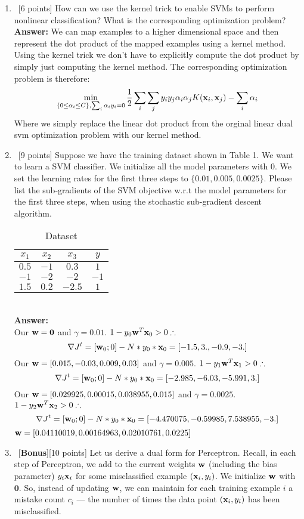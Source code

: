\documentclass[12pt, fullpage,letterpaper]{article}
\newcommand{\Answer}{{\\\textbf{Answer: }}}
\begin{document}
\begin{enumerate}
	
	\item~[6 points] How can we use the kernel trick to enable SVMs to perform nonlinear classification? What is the corresponding optimization problem?
	\Answer We can map examples to a higher dimensional space and then represent the dot product of the mapped examples using a kernel method.  Using the kernel trick we don't have to explicitly compute the dot product by simply just computing the kernel method.  The corresponding optimization problem is therefore: 
	\[\min_{\{0 \leq \alpha_i \leq C\}, \sum_i \alpha_i y_i = 0} \frac{1}{2}\sum_i \sum_j y_i y_j \alpha_i \alpha_j K({\bf x}_i, {\bf x}_j) - \sum_i \alpha_i\]
	Where we simply replace the linear dot product from the orginal linear dual svm optimization problem with our kernel method.
		
	\item~[9 points] Suppose we have the training dataset shown in Table 1. We want to learn a SVM classifier. We initialize all the model parameters with $0$. We set the learning rates for the first three steps to $\{0.01, 0.005, 0.0025\}$.  Please list the sub-gradients of the SVM objective w.r.t the model parameters for the first three steps, when using the stochastic sub-gradient descent algorithm. 
	\begin{table}[h]
		\centering
		\begin{tabular}{ccc|c}
			$x_1$ & $x_2$ & $x_3$ &  $y$\\ 
			\hline\hline
			$0.5$ & $-1$ & $0.3$ & $1$ \\ \hline
			$-1$ & $-2$ & $-2$ & $-1$\\ \hline
			$1.5$ & $0.2$ & $-2.5$ & $1$\\ \hline
		\end{tabular}
	\caption{Dataset}
	\end{table}
	\Answer\\
	Our ${\bf w} = {\bf 0}$ and $\gamma = 0.01$.  $1 - y_0 {\bf w}^T {\bf x}_0 > 0 \therefore$
	\[\nabla J^t = [{\bf w}_0; 0] - N * y_0 * {\bf x}_0 = [-1.5,  3. , -0.9, -3. ]\]
	Our ${\bf w} = [ 0.015, -0.03 ,  0.009,  0.03 ]$ and $\gamma = 0.005$. $1 - y_1 {\bf w}^T {\bf x}_1 > 0 \therefore$
	\[\nabla J^t = [{\bf w}_0; 0] - N * y_0 * {\bf x}_0 = [-2.985, -6.03 , -5.991,  3.   ]\]
	Our ${\bf w} = [0.029925, 0.00015 , 0.038955, 0.015   ]$ and $\gamma = 0.0025$. $1 - y_2 {\bf w}^T {\bf x}_2 > 0 \therefore$
	\[\nabla J^t = [{\bf w}_0; 0] - N * y_0 * {\bf x}_0 = [-4.470075, -0.59985 ,  7.538955, -3.      ]\]
	${\bf w} = [0.04110019, 0.00164963, 0.02010761, 0.0225    ]$

	\item~[\textbf{Bonus}][10 points] Let us derive a dual form for Perceptron. Recall, in each step of Perceptron, we add to the current weights ${\bf w}$ (including the bias parameter) $y_i{\bf x}_i$ for some misclassified example $({\bf x}_i, y_i)$. We initialize ${\bf w}$ with $\mathbf{0}$. So, instead of updating ${\bf w}$, we can maintain for each training example $i$ a mistake count $c_i$ --- the number of times the data point $({\bf x}_i, y_i)$ has been misclassified. 
	

\end{enumerate}
\end{document}
